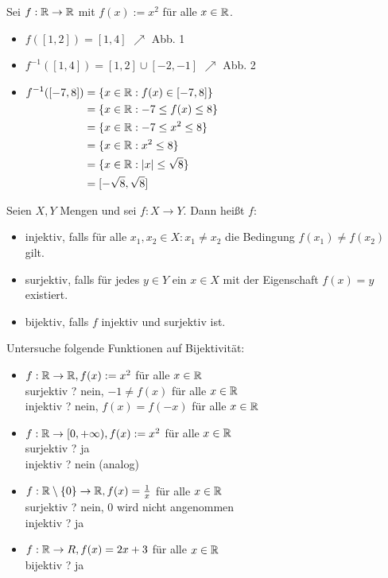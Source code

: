 \begin{bsp}
	Sei $ f : \mathbb{R} \to \mathbb{R} $ mit $ f(x) := x^2 $ für alle $ x \in \mathbb{R} $.
	\begin{itemize}
		\item $ f( [1,2] ) = [1,4] $ $ \nearrow $ Abb. 1
		\item $ f^{-1}( [1,4] ) = [1,2] \cup [-2,-1] $ $ \nearrow $ Abb. 2
		\item
		$ \begin{aligned}[t]
			f^{-1}( [-7,8] ) &= \{ x \in \mathbb{R} : f(x) \in [-7,8] \} \\
			&= \{ x \in \mathbb{R} : -7 \leq f(x) \leq 8 \} \\
			&= \{ x \in \mathbb{R} : -7 \leq x^2 \leq 8 \} \\
			&= \{ x \in \mathbb{R} : x^2 \leq 8 \} \\
			&= \{ x \in \mathbb{R} : |x| \leq \sqrt{8} \} \\
			&= [-\sqrt{8},\sqrt{8}]
		\end{aligned} $
\end{itemize}
\end{bsp}


\begin{defn}
Seien $ X,Y $ Mengen und sei $ f : X \to Y $. Dann heißt $ f $:
\begin{itemize}
	\item injektiv, falls für alle $ x_1, x_2 \in X : x_1 \neq x_2 $ die Bedingung $ f(x_1) \neq f(x_2) $ gilt.
	\item surjektiv, falls für jedes $ y \in Y $ ein $ x \in X $ mit der Eigenschaft $ f(x) = y $ existiert.
	\item bijektiv, falls $ f $ injektiv und surjektiv ist.
\end{itemize}
\end{defn}

\begin{bsp}
	Untersuche folgende Funktionen auf Bijektivität:
	\begin{itemize}
		\item $ f : \mathbb{R} \to \mathbb{R}, f(x) := x^2 $ für alle $ x \in \mathbb{R} $\\
		surjektiv ? nein, $ -1 \neq f(x) $ für alle $ x \in \mathbb{R} $\\
		injektiv ? nein, $ f(x) = f(-x) $ für alle $ x \in \mathbb{R} $
		\item $ f : \mathbb{R} \to [0,+\infty), f(x) := x^2 $ für alle $ x \in \mathbb{R} $\\
		surjektiv ? ja\\
		injektiv ? nein (analog)
		\item $ f : \mathbb{R} \setminus \{ 0 \} \to \mathbb{R}, f(x) = \frac{1}{x} $ für alle $ x \in \mathbb{R} $\\
		surjektiv ? nein, 0 wird nicht angenommen\\
		injektiv ? ja
		\item $ f : \mathbb{R} \to R, f(x) = 2x + 3 $ für alle $ x \in \mathbb{R} $\\
		bijektiv ? ja
	\end{itemize}
\end{bsp}


